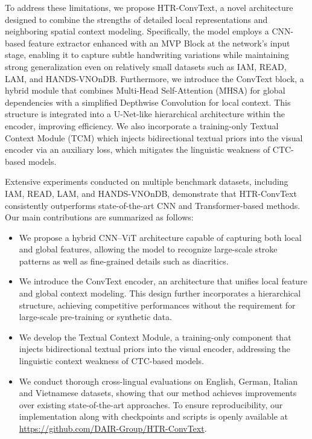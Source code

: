 \documentclass[final,5p,times]{elsarticle}
\begin{document}
To address these limitations, we propose HTR-ConvText, a novel architecture designed to combine the strengths of detailed local representations and neighboring spatial context modeling. Specifically, the model employs a CNN-based feature extractor enhanced with an MVP Block at the network’s input stage, enabling it to capture subtle handwriting variations while maintaining strong generalization even on relatively small datasets such as IAM, READ, LAM, and HANDS-VNOnDB. Furthermore, we introduce the ConvText block, a hybrid module that combines Multi-Head Self-Attention (MHSA) for global dependencies with a simplified Depthwise Convolution for local context. This structure is integrated into a U-Net-like hierarchical architecture within the encoder, improving efficiency. We also incorporate a training-only Textual Context Module (TCM) which injects bidirectional textual priors into the visual encoder via an auxiliary loss, which mitigates the linguistic weakness of CTC-based models.

Extensive experiments conducted on multiple benchmark datasets, including IAM, READ, LAM, and  HANDS-VNOnDB, demonstrate that HTR-ConvText consistently outperforms state-of-the-art CNN and Transformer-based methods. Our main contributions are summarized as follows:
\begin{itemize}
\item We propose a hybrid CNN–ViT architecture capable of capturing both local and global features, allowing the model to recognize large-scale stroke patterns as well as fine-grained details such as diacritics.
\item We introduce the ConvText encoder, an architecture that unifies local feature and global context modeling. This design further incorporates a hierarchical structure, achieving competitive performances without the requirement for large-scale pre-training or synthetic data.
\item We develop the Textual Context Module, a training-only component that injects bidirectional textual priors into the visual encoder, addressing the linguistic context weakness of CTC-based models.
\item We conduct thorough cross-lingual evaluations on English, German, Italian and Vietnamese datasets, showing that our method achieves improvements over existing state-of-the-art approaches. To ensure reproducibility, our implementation along with checkpoints and scripts is openly available at \url{https://github.com/DAIR-Group/HTR-ConvText}.

\end{itemize}
\end{document}
